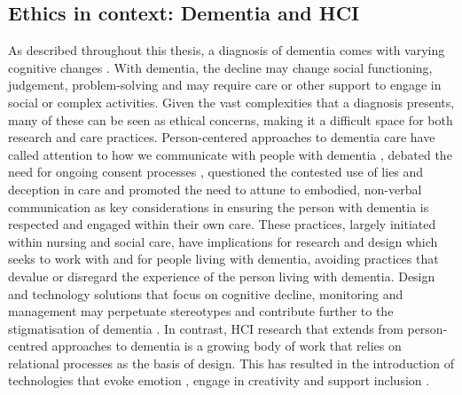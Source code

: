 \subsection{Ethics in context: Dementia and HCI}
\label{RelatedWork:DementiaandHCI}
As described throughout this thesis, a diagnosis of dementia comes with varying cognitive changes \citep{hampson_dementia:_2016}. With dementia, the decline may change social functioning, judgement, problem-solving and may require care or other support to engage in social or complex activities. Given the vast complexities that a diagnosis presents, many of these can be seen as ethical concerns, making it a difficult space for both research and care practices. Person-centered approaches to dementia care have called attention to how we communicate with people with dementia \citep{oyebode_mental_2005}, debated the need for ongoing consent processes \citep{dewing_participatory_2007}, questioned the contested use of lies and deception in care \citep{elvish_lying_2010} and promoted the need to attune to embodied, non-verbal communication \citep{group_patron_2019,twigg_dress_2013} as key considerations in ensuring the person with dementia is respected and engaged within their own care. These practices, largely initiated within nursing and social care, have implications for research and design which seeks to work with and for people living with dementia, avoiding practices that devalue or disregard the experience of the person living with dementia. Design and technology solutions that focus on cognitive decline, monitoring and management may perpetuate stereotypes and contribute further to the stigmatisation of dementia \citep{low2020negative}. In contrast, HCI research that extends from person-centred approaches to dementia is a growing body of work that relies on relational processes as the basis of design. This has resulted in the introduction of technologies that evoke emotion \citep{wallace_enabling_2012-1,houben_foregrounding_2019,dixon_approach_2020} , engage in creativity \citep{lindsay_empathy_2012,morrissey_im_2016} and support inclusion \citep{welsh_ticket_2018,foley_printer_2019,treadaway_sensor_2016}.

